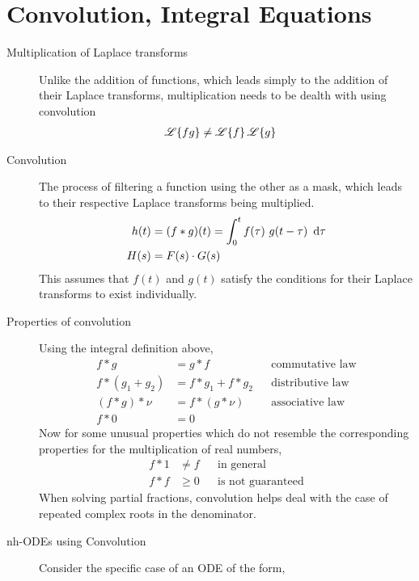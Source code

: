 \section{Convolution, Integral Equations}
\begin{description}
    \item[Multiplication of Laplace transforms]  Unlike the addition of functions, which
        leads simply to the addition of their Laplace transforms, multiplication needs to be
        dealth with using convolution
        \begin{align}
            \operatorname{\mathscr{L}}\{fg\} & \neq \operatorname{\mathscr{L}}\{f\} \operatorname{\mathscr{L}}\{g\}
        \end{align}
    \item[Convolution] The process of filtering a function using the other as a mask,
        which leads to their respective Laplace transforms being multiplied.
        \begin{align}
            h(t) & = (f * g)(t) = \int_{0}^{t} f(\tau)\ g(t - \tau)\ \dl \tau \\
            H(s) & = F(s) \cdot G(s)
        \end{align}
        This assumes that $ f(t) $ and $ g(t) $ satisfy the conditions for their
        Laplace transforms to exist individually.
    \item[Properties of convolution] Using the integral definition above,
        \begin{align}
            f * g           & = g * f             &  & \text{commutative law}  \\
            f * (g_1 + g_2) & = f * g_1 + f * g_2 &  & \text{distributive law} \\
            (f * g) * \nu   & = f * (g * \nu)     &  & \text{associative law}  \\
            f * 0           & = 0
        \end{align}
        Now for some unusual properties which do not resemble the corresponding
        properties for the multiplication of real numbers,
        \begin{align}
            f * 1 & \neq f &  & \text{in general}        \\
            f * f & \geq 0 &  & \text{is not guaranteed}
        \end{align}
        When solving partial fractions, convolution helps deal with the case of
        repeated complex roots in the denominator.
    \item[nh-ODEs using Convolution] Consider the specific case of an ODE of the form,

\end{description}
